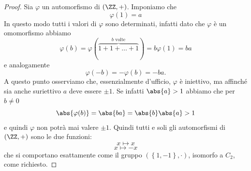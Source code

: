 \documentclass[11pt]{scrartcl}
\begin{document}
	\begin{proof}
		Sia $\varphi$ un automorfismo di $(\ZZ,+)$. Imponiamo che
		$$\varphi(1)=a$$
		In questo modo tutti i valori di $\varphi$ sono determinati, infatti dato che $\varphi$ è un omomorfismo abbiamo
		$$\varphi(b)=\varphi(\overset{\text{$b$ volte}}{\overbrace{1+1+\dots+1}})=b\varphi(1)=ba$$
		e analogamente 
		$$\varphi(-b)=-\varphi(b)=-ba.$$
		A questo punto osserviamo che, essenzialmente d'ufficio, $\varphi$ è iniettivo, ma affinché sia anche suriettivo $a$ deve essere $\pm 1$. Se infatti $\abs{a}>1$ abbiamo che per $b\ne 0$
		$$\abs{\varphi(b)}=\abs{ba}=\abs{b}\abs{a}>1$$
		e quindi $\varphi$ non potrà mai valere $\pm 1$. Quindi tutti e soli gli automorfismi di $(\ZZ,+)$ sono le due funzioni:
		$$x\mapsto x$$
		$$x\mapsto -x$$
		che si comportano esattamente come il gruppo $\left(\left\{1,-1\right\},\cdot\right)$, isomorfo a $C_2$, come richiesto.
	\end{proof}
	
\end{document}
